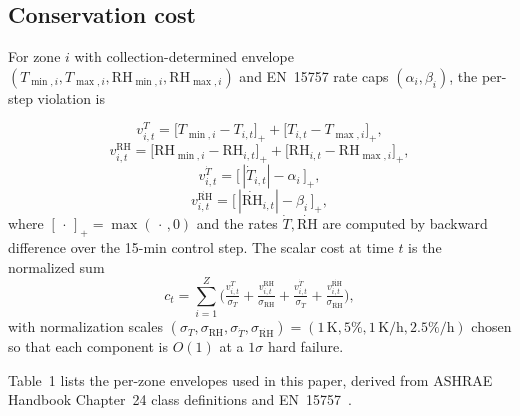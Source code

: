 \documentclass[11pt,a4paper]{article}
\begin{document}
\subsection{Conservation cost}\label{sec:conservation_cost}

For zone $i$ with collection-determined envelope
$(T_{\min,i},T_{\max,i},\mathrm{RH}_{\min,i},\mathrm{RH}_{\max,i})$ and
EN~15757 rate caps $(\alpha_i,\beta_i)$, the per-step violation is

\begin{equation}
v^{T}_{i,t}  = \big[T_{\min,i}-T_{i,t}\big]_+ + \big[T_{i,t}-T_{\max,i}\big]_+,
\label{eq:vT}
\end{equation}
\begin{equation}
v^{\mathrm{RH}}_{i,t}= \big[\mathrm{RH}_{\min,i}-\mathrm{RH}_{i,t}\big]_+ +
                       \big[\mathrm{RH}_{i,t}-\mathrm{RH}_{\max,i}\big]_+,
\label{eq:vRH}
\end{equation}
\begin{equation}
v^{\dot T}_{i,t}     = \big[\,|\dot T_{i,t}|-\alpha_i\,\big]_+,
\label{eq:vTdot}
\end{equation}
\begin{equation}
v^{\dot{\mathrm{RH}}}_{i,t} = \big[\,|\dot{\mathrm{RH}}_{i,t}|-\beta_i\,\big]_+,
\label{eq:vRHdot}
\end{equation}
where $[\,\cdot\,]_+=\max(\,\cdot\,,0)$ and the rates $\dot T,
\dot{\mathrm{RH}}$ are computed by backward difference over the 15-min
control step. The scalar cost at time $t$ is the normalized sum
\begin{equation}
c_t = \sum_{i=1}^{Z}\Big(
   \tfrac{v^{T}_{i,t}}{\sigma_T}
 + \tfrac{v^{\mathrm{RH}}_{i,t}}{\sigma_{\mathrm{RH}}}
 + \tfrac{v^{\dot T}_{i,t}}{\sigma_{\dot T}}
 + \tfrac{v^{\dot{\mathrm{RH}}}_{i,t}}{\sigma_{\dot{\mathrm{RH}}}}\Big),
\label{eq:cost}
\end{equation}
with normalization scales $(\sigma_T,\sigma_{\mathrm{RH}},\sigma_{\dot T},
\sigma_{\dot{\mathrm{RH}}})=(1\,\mathrm{K},5\%,1\,\mathrm{K/h},2.5\%/\mathrm{h})$
chosen so that each component is $O(1)$ at a $1\sigma$ hard failure.

Table~1 lists the per-zone envelopes used in this
paper, derived from ASHRAE Handbook Chapter~24 class definitions
\citep{ashrae_handbook_ch24} and EN~15757~\citep{en15757}.
\end{document}
